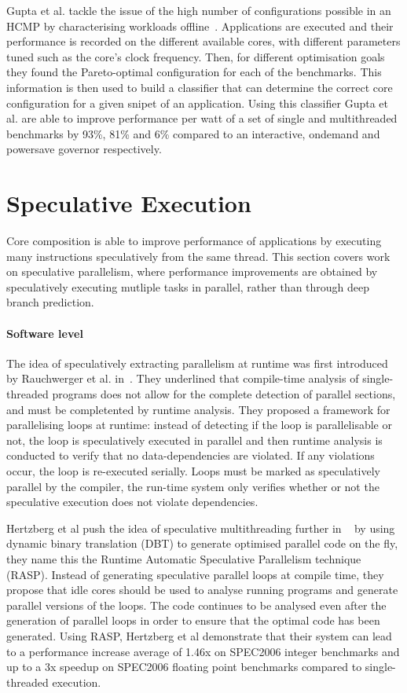 Gupta et al. tackle the issue of the high number of configurations possible in an HCMP by characterising workloads offline~\cite{Gupta2017Dypo}.
Applications are executed and their performance is recorded on the different available cores, with different parameters tuned such as the core's clock frequency.
Then, for different optimisation goals they found the Pareto-optimal configuration for each of the benchmarks.
This information is then used to build a classifier that can determine the correct core configuration for a given snipet of an application.
Using this classifier Gupta et al. are able to improve performance per watt of a set of single and multithreaded benchmarks by 93\%, 81\% and 6\% compared to an interactive, ondemand and powersave governor respectively.

\section{Speculative Execution}
Core composition is able to improve performance of applications by executing many instructions speculatively from the same thread.
This section covers work on speculative parallelism, where performance improvements are obtained by speculatively executing mutliple tasks in parallel, rather than through deep branch prediction.

\paragraph*{Software level}
The idea of speculatively extracting parallelism at runtime was first introduced by Rauchwerger et al. in~\cite{runtimeSpec}.
They underlined that compile-time analysis of single-threaded programs does not allow for the complete detection of parallel sections, and must be completented by runtime analysis.
They proposed a framework for parallelising loops at runtime: instead of detecting if the loop is parallelisable or not, the loop is speculatively executed in parallel and then runtime analysis is conducted to verify that no data-dependencies are violated.
If any violations occur, the loop is re-executed serially.
Loops must be marked as speculatively parallel by the compiler, the run-time system only verifies whether or not the speculative execution does not violate dependencies.

Hertzberg et al push the idea of speculative multithreading further in ~\cite{dbtspec2011} by using dynamic binary translation (DBT) to generate optimised parallel code on the fly, they name this the Runtime Automatic Speculative Parallelism technique (RASP).
Instead of generating speculative parallel loops at compile time, they propose that idle cores should be used to analyse running programs and generate parallel versions of the loops.
The code continues to be analysed even after the generation of parallel loops in order to ensure that the optimal code has been generated.
Using RASP, Hertzberg et al demonstrate that their system can lead to a performance increase average of 1.46x on SPEC2006 integer benchmarks and up to a 3x speedup on SPEC2006 floating point benchmarks compared to single-threaded execution.

